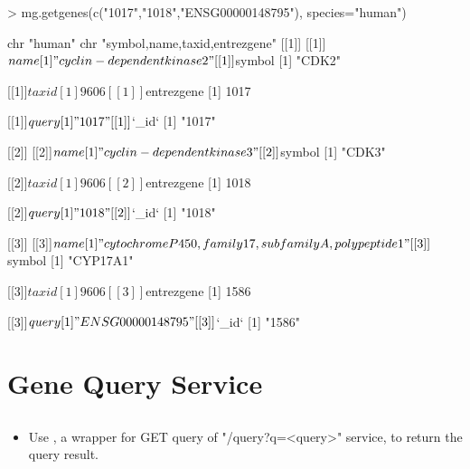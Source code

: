 \documentclass[12pt]{article}
\begin{document}
\begin{Schunk}
\begin{Sinput}
> mg.getgenes(c("1017","1018","ENSG00000148795"), species="human")
\end{Sinput}
\begin{Soutput}
 chr "human"
 chr "symbol,name,taxid,entrezgene"
[[1]]
[[1]]$name
[1] "cyclin-dependent kinase 2"

[[1]]$symbol
[1] "CDK2"

[[1]]$taxid
[1] 9606

[[1]]$entrezgene
[1] 1017

[[1]]$query
[1] "1017"

[[1]]$`_id`
[1] "1017"


[[2]]
[[2]]$name
[1] "cyclin-dependent kinase 3"

[[2]]$symbol
[1] "CDK3"

[[2]]$taxid
[1] 9606

[[2]]$entrezgene
[1] 1018

[[2]]$query
[1] "1018"

[[2]]$`_id`
[1] "1018"


[[3]]
[[3]]$name
[1] "cytochrome P450, family 17, subfamily A, polypeptide 1"

[[3]]$symbol
[1] "CYP17A1"

[[3]]$taxid
[1] 9606

[[3]]$entrezgene
[1] 1586

[[3]]$query
[1] "ENSG00000148795"

[[3]]$`_id`
[1] "1586"
\end{Soutput}
\end{Schunk}


\section{Gene Query Service}

\subsection{}

\begin{itemize}
\item Use , a wrapper for GET query of "/query?q=<query>" service, to return  the query result.
\end{itemize}
\end{document}
